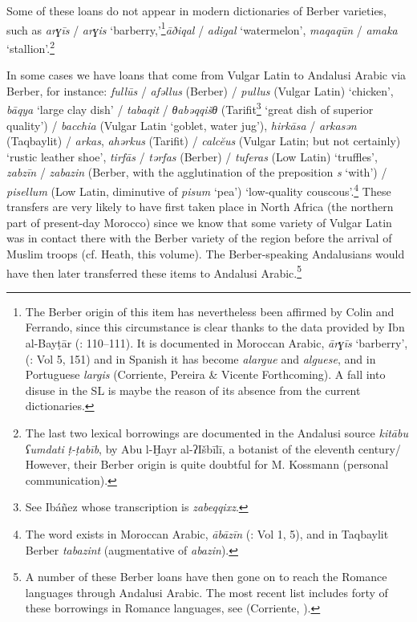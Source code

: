 \documentclass[output=paper,modfonts,nonflat]{langsci/langscibook}
\begin{document}
Some of these loans do not appear in modern dictionaries of Berber varieties, such as \textit{arɣīs} / \textit{arɣis} ‘barberry,’\footnote{The Berber origin of this item has nevertheless been affirmed by Colin and Ferrando, since this circumstance is clear thanks to the data provided by Ibn al-Bayṭār (\citealt{Ferrando1997}: 110–111). It is documented in Moroccan Arabic, \textit{ārɣīs} ‘barberry’, (\citealt{Prémare1995}: Vol 5, 151) and in Spanish it has become \textit{alargue} and \textit{alguese}, and in Portuguese \textit{largis} (Corriente, Pereira \& Vicente Forthcoming). A fall into disuse in the SL is maybe the reason of its absence from the current dictionaries.}\textit{āðiqal} / \textit{adigal} ‘watermelon’, \textit{maqaqūn} / \textit{amaka} ‘stallion’.\footnote{The last two lexical borrowings are documented in the Andalusi source \textit{kitābu} \textit{ʕumdati} \textit{ṭ-ṭabīb}, by Abu l-Ḫayr al-ʔIšbīlī, a botanist of the eleventh century/ However, their Berber origin is quite doubtful for M. Kossmann (personal communication).} 

In some cases we have loans that come from Vulgar Latin to Andalusi Arabic via Berber, for instance: \textit{fullūs} / \textit{afǝllus} (Berber) / \textit{pullus} (Vulgar Latin) ‘chicken’, \textit{bāqya} ‘large clay dish’ / \textit{tabaqit} / \textit{θabǝqqišθ} (Tarifit\footnote{See Ibáñez \citep[272]{Ibáñez1949} whose transcription is \textit{zabeqqixz}.}  ‘great dish of superior quality’) / \textit{bacchia} (Vulgar Latin ‘goblet, water jug’), \textit{hirkāsa} / \textit{arkasǝn} (Taqbaylit) / \textit{arkas}, \textit{ahǝrkus} (Tarifit) / \textit{calcĕus} (Vulgar Latin; but not certainly) ‘rustic leather shoe’, \textit{tirfās} / \textit{tǝrfas} (Berber) / \textit{tuferas} (Low Latin) ‘truffles’, \textit{zabzīn} / \textit{zabazin} (Berber, {with the agglutination of the preposition} \textit{s} ‘with’) / \textit{pisellum} (Low Latin, diminutive of \textit{pisum} ‘pea’) ‘low-quality couscous’.\footnote{The word exists in Moroccan Arabic, \textit{ābāzīn} (\citealt{Prémare1993}: Vol 1, 5), and in Taqbaylit Berber \textit{tabazint} (augmentative of \textit{abazin}).}  These transfers are very likely to have first taken place in North Africa (the northern part of present-day Morocco) since we know that some variety of Vulgar Latin was in contact there with the Berber variety of the region before the arrival of Muslim troops (cf. Heath, this volume). The Berber-speaking Andalusians would have then later transferred these items to Andalusi Arabic.\footnote{A number of these Berber loans have then gone on to reach the Romance languages through Andalusi Arabic. The most recent list includes forty of these borrowings in Romance languages, see (Corriente, \citealt{PereiraVicente2019}).}  
\end{document}
